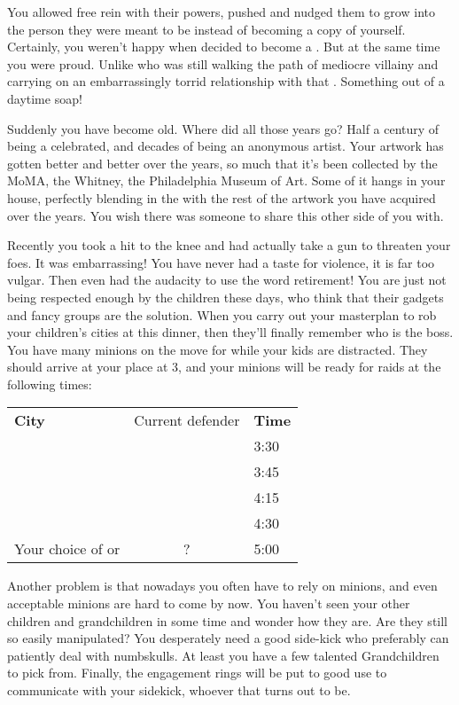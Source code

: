 \documentclass[char]{LRSguildcamp1}
\begin{document}
You allowed \cYoungest{} free rein with their powers, pushed and nudged them to grow into the person they were meant to be instead of becoming a copy of yourself. Certainly, you weren't happy when \cYoungest{\they} decided to become a \cYoungest{\hero}. But at the same time you were proud. Unlike \cOldest{} who was still walking the path of mediocre villainy and carrying on an embarrassingly torrid relationship with that \cOS{\hero}. Something out of a daytime soap! 

Suddenly you have become old. Where did all those years go? Half a century of being a celebrated\cGrandma{\villain}, and decades of being an anonymous artist. Your artwork has gotten better and better over the years, so much that it's been collected by the MoMA, the Whitney, the Philadelphia Museum of Art. Some of it hangs in your house, perfectly blending in the with the rest of the artwork you have acquired over the years. You wish there was someone to share this other side of you with. 

Recently you took a hit to the knee and had actually take a gun to threaten your foes. It was embarrassing! You have never had a taste for violence, it is far too vulgar. Then \cOldest{} even had the audacity to use the word retirement! You are just not being respected enough by the children these days, who think that their gadgets and fancy groups are the solution. When you carry out your masterplan to rob your children's cities at this dinner, then they'll finally remember who is the boss.  You have many minions on the move for while your kids are distracted.  They should arrive at your place at 3, and your minions will be ready for raids at the following times:

\begin{tabular}{|l|c|l|}
{\bf City} & Current defender & {\bf Time} \\
\pCityYoungest{} & \cYoungest{} & 3:30 \\
\pCityO{} & \cOldest{} & 3:45 \\
\pCityYoungest{} & \cYoungest{} & 4:15 \\
\pCityO{} & \cOldest{} & 4:30 \\
Your choice of \pCityYoungest{} or \pCityO{} & ? & 5:00
\end{tabular}

Another problem is that nowadays you often have to rely on minions, and even acceptable minions are hard to come by now. You haven't seen your other children and grandchildren in some time and wonder how they are. Are they still so easily manipulated? You desperately need a good side-kick who preferably can patiently deal with numbskulls.  At least you have a few talented Grandchildren to pick from. Finally, the engagement rings will be put to good use to communicate with your sidekick, whoever that turns out to be. 
\end{document}
